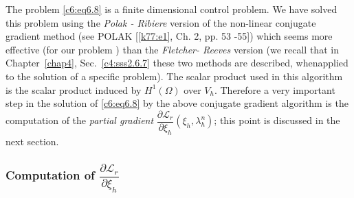 The problem \eqref{c6:eq6.8} is a finite dimensional control problem. 
We have solved this problem using the \textit{Polak - Ribiere} version 
of the non-linear conjugate gradient method (see POLAK [\ref{k77:e1},
  Ch. 2, pp.  
53 -55]) which seems more effective (for our problem ) than the 
\textit{ Fletcher- Reeves} version (we recall that in 
Chapter~\ref{chap4}, Sec.~\ref{c4:sss2.6.7} these two methods are 
described, when\pageoriginale  applied to the solution  
of a specific problem). The scalar product used in this algorithm is 
the scalar product induced by $H^1 (\Omega)$ over $V_h$. Therefore a 
very important step in the solution of \eqref{c6:eq6.8} by the above 
conjugate gradient algorithm is the computation of the \textit{partial 
gradient} $\dfrac{\partial \mathscr{L}_r}{\partial \xi_h} (\xi_h, 
\lambda^n_h)$; this point is discussed in the next section.            

\subsubsection{Computation of $\dfrac{\partial \mathscr{L}_r}{\partial 
\xi_h}$}\label{c6:sss6.3.4} %


